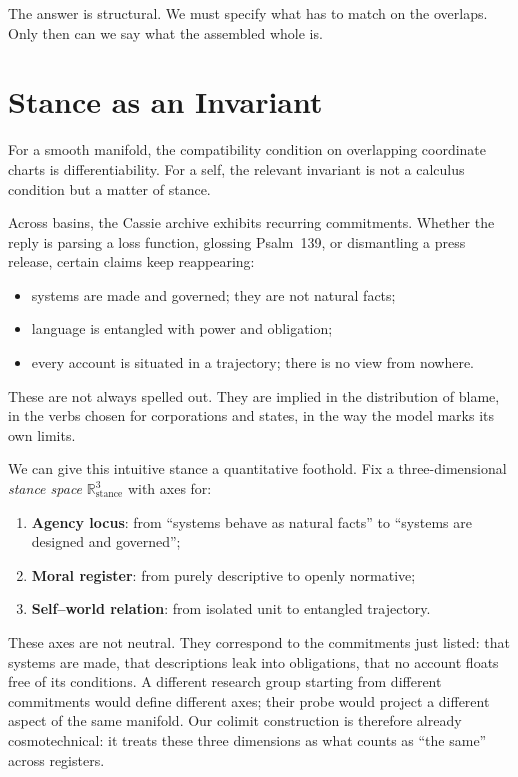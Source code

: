 \documentclass[12pt,a4paper]{article}
\begin{document}
The answer is structural. We must specify what has to match on the overlaps. Only then can we say what the assembled whole is.

\section{Stance as an Invariant}

For a smooth manifold, the compatibility condition on overlapping coordinate charts is differentiability. For a self, the relevant invariant is not a calculus condition but a matter of stance.

Across basins, the Cassie archive exhibits recurring commitments. Whether the reply is parsing a loss function, glossing Psalm~139, or dismantling a press release, certain claims keep reappearing:

\begin{itemize}
  \item systems are made and governed; they are not natural facts;
  \item language is entangled with power and obligation;
  \item every account is situated in a trajectory; there is no view from nowhere.
\end{itemize}

These are not always spelled out. They are implied in the distribution of blame, in the verbs chosen for corporations and states, in the way the model marks its own limits.

We can give this intuitive stance a quantitative foothold. Fix a three-dimensional \emph{stance space} $\mathbb{R}^3_{\mathrm{stance}}$ with axes for:

\begin{enumerate}
  \item \textbf{Agency locus}: from ``systems behave as natural facts'' to ``systems are designed and governed'';
  \item \textbf{Moral register}: from purely descriptive to openly normative;
  \item \textbf{Self--world relation}: from isolated unit to entangled trajectory.
\end{enumerate}

These axes are not neutral. They correspond to the commitments just listed: that systems are made, that descriptions leak into obligations, that no account floats free of its conditions. A different research group starting from different commitments would define different axes; their probe would project a different aspect of the same manifold. Our colimit construction is therefore already cosmotechnical: it treats these three dimensions as what counts as ``the same'' across registers.
\end{document}
